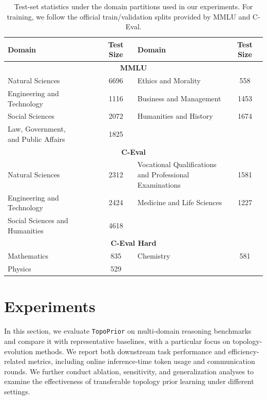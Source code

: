 \documentclass[lettersize,journal]{IEEEtran}
\theoremstyle{plain}
\begin{document}
\begin{table}[!t]
\centering
\caption{Test-set statistics under the domain partitions used in our experiments. For training, we follow the official train/validation splits provided by MMLU and C-Eval.}
\scriptsize
\setlength{\tabcolsep}{4pt}
\renewcommand{\arraystretch}{1.0}
\begin{tabular}{p{}c p{}c}
\toprule
\textbf{Domain} & \textbf{Test Size} & \textbf{Domain} & \textbf{Test Size} \\
\midrule
\multicolumn{4}{c}{\textbf{MMLU}} \\
\midrule
Natural Sciences & 6696 & Ethics and Morality & 558 \\
Engineering and Technology & 1116 & Business and Management & 1453 \\
Social Sciences & 2072 & Humanities and History & 1674 \\
\makecell[l]{Law, Government, \\ and Public Affairs} & 1825 & & \\
\midrule
\multicolumn{4}{c}{\textbf{C-Eval}} \\
\midrule
Natural Sciences & 2312 & \makecell[l]{Vocational Qualifications \\ and Professional Examinations} & 1581 \\
Engineering and Technology & 2424 & Medicine and Life Sciences & 1227 \\
Social Sciences and Humanities & 4618 & & \\
\midrule
\multicolumn{4}{c}{\textbf{C-Eval Hard}} \\
\midrule
Mathematics & 835 & Chemistry & 581 \\
Physics & 529 & & \\
\bottomrule
\end{tabular}
\label{dataset_size}
\vspace{-1em}
\end{table}

\section{Experiments}
\label{all_exp}
In this section, we evaluate \texttt{TopoPrior} on multi-domain reasoning benchmarks and compare it with representative baselines, with a particular focus on topology-evolution methods. We report both downstream task performance and efficiency-related metrics, including online inference-time token usage and communication rounds. We further conduct ablation, sensitivity, and generalization analyses to examine the effectiveness of transferable topology prior learning under different settings.
\end{document}
